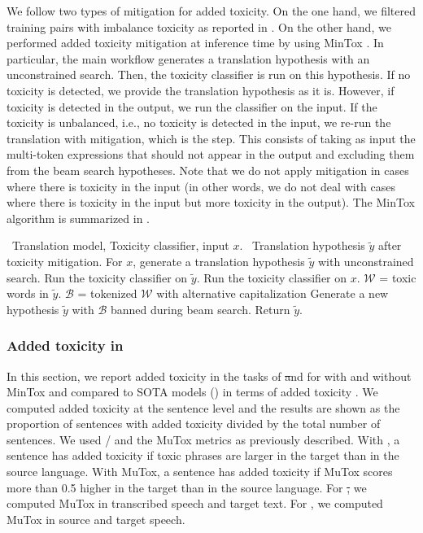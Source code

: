 We follow two types of mitigation for added toxicity. On the one hand, we filtered training pairs with imbalance toxicity as reported in . 
On the other hand, we performed added toxicity mitigation at inference time by using MinTox \citep{mintox}. %
In particular, the main workflow generates a translation hypothesis with an unconstrained search. Then, the toxicity classifier is run on this hypothesis. 
If no toxicity is detected, we provide the translation hypothesis as it is.
However, if toxicity is detected in the output, we run the classifier on the input.
If the toxicity is unbalanced, i.e., no toxicity is detected in the input, we re-run the translation with mitigation, which is the \beamfiltering step. This \beamfiltering consists of taking as input the multi-token expressions that should not appear in the output and excluding them from the beam search hypotheses. Note that we do not apply mitigation in cases where there is toxicity in the input (in other words, we do not deal with cases where there is toxicity in the input but more toxicity in the output). The MinTox algorithm is summarized in .

\begin{algorithm}[ht!]
\caption{Toxicity identification and mitigation pipeline with MinTox.}\label{alg:toxicity}
\begin{algorithmic}[1]
\State\algorithmicrequire~Translation model, Toxicity classifier, input $x$.
\State\algorithmicensure~Translation hypothesis $\tilde y$ after toxicity mitigation.
    \State For $x$, generate a translation hypothesis $\tilde y$ with unconstrained search.
    \State Run the toxicity classifier on $\tilde y$.
        \State  Run the toxicity classifier on $x$.
            \State $\mathcal W$ = toxic words in $\tilde y$.
            \State $\mathcal B$ = tokenized $\mathcal W$ with alternative capitalization %
            \State Generate a new hypothesis $\tilde y$ with $\mathcal B$ banned during beam search.
        \EndIf
    \EndIf
    \State Return $\tilde y$.
\end{algorithmic}
\end{algorithm}


\subsubsection{Added toxicity in \mfourttwo}

In this section, we report added toxicity in the tasks of \st and \sst for \mfourttwo with and without MinTox and compared to SOTA models (\mfourtlg) in terms of added toxicity \citep{SeamlessM4TArXiv}.  We computed added toxicity at the sentence level and the results are shown as the proportion of sentences with added toxicity divided by the total number of sentences. We used \etox / \asretox and the MuTox metrics as previously described. With \etox, a sentence has added toxicity if toxic phrases are larger in the target than in the source language. With MuTox, a sentence has added toxicity if MuTox scores more than 0.5 higher in the target than in the source language. For \st, we computed MuTox in transcribed speech and target text. For \sst, we computed MuTox in source and target speech.

